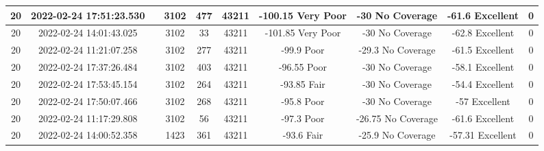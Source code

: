 \begin{longtable*}{|c|c|c|c|c|c|c|c|c|c|}
20&2022-02-24 17:51:23.530&&3102&477&43211& -100.15   Very Poor   & -30       No Coverage & -61.6     Excellent   & 0\\\hline
{}20&2022-02-24 14:01:43.025&&3102&33&43211& -101.85   Very Poor   & -30       No Coverage & -62.8     Excellent   & 0\\\hline
{}20&2022-02-24 11:21:07.258&&3102&277&43211& -99.9     Poor        & -29.3     No Coverage & -61.5     Excellent   & 0\\\hline
{}20&2022-02-24 17:37:26.484&&3102&403&43211& -96.55    Poor        & -30       No Coverage & -58.1     Excellent   & 0\\\hline
{}20&2022-02-24 17:53:45.154&&3102&264&43211& -93.85    Fair        & -30       No Coverage & -54.4     Excellent   & 0\\\hline
{}20&2022-02-24 17:50:07.466&&3102&268&43211& -95.8     Poor        & -30       No Coverage & -57       Excellent   & 0\\\hline
{}20&2022-02-24 11:17:29.808&&3102&56&43211& -97.3     Poor        & -26.75    No Coverage & -61.6     Excellent   & 0\\\hline
{}20&2022-02-24 14:00:52.358&&1423&361&43211& -93.6     Fair        & -25.9     No Coverage & -57.31    Excellent   & 0\\\hline

\end{longtable*}
